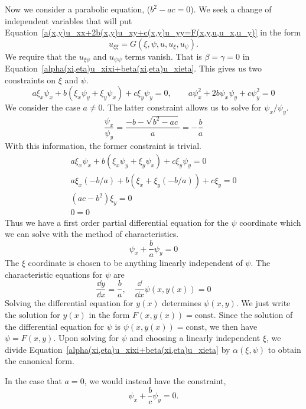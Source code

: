 Now we consider a parabolic equation, ($b^2 - a c = 0$).
We seek a change of independent variables that will put 
Equation~\ref{a(x,y)u_xx+2b(x,y)u_xy+c(x,y)u_yy=F(x,y,u,u_x,u_y)}
in the form
\begin{equation}
  \label{eqn uxixi=Gxipsiuuu}
  u_{\xi \xi} = G(\xi, \psi, u, u_\xi, u_\psi).
\end{equation}
We require that the $u_{\xi \psi}$ and $u_{\psi\psi}$ terms vanish.
That is $\beta = \gamma = 0$ in 
Equation~\ref{alpha(xi,eta)u_xixi+beta(xi,eta)u_xieta}.
This gives us two constraints on $\xi$ and $\psi$.
\[
a \xi_x \psi_x + b(\xi_x \psi_y + \xi_y \psi_x ) + c \xi_y \psi_y = 0, \qquad a \psi_x^2 + 2 b \psi_x \psi_y + c \psi_y^2 = 0 
\]
We consider the case $a \neq 0$.  The latter constraint allows us to solve 
for $\psi_x / \psi_y$.
\[
\frac{\psi_x}{\psi_y} = \frac{-b - \sqrt{b^2 - a c}}{a} = - \frac{b}{a}
\]
With this information, the former constraint is trivial.
\begin{gather*}
  a \xi_x \psi_x + b(\xi_x \psi_y + \xi_y \psi_x ) + c \xi_y \psi_y = 0
  \\
  a \xi_x (-b/a) + b(\xi_x + \xi_y (-b/a) ) + c \xi_y = 0
  \\
  (a c - b^2) \xi_y = 0
  \\
  0 = 0
\end{gather*}
Thus we have a first order partial differential equation for the $\psi$ 
coordinate which we can solve with the method of characteristics.
\[
\psi_x + \frac{b}{a} \psi_y = 0
\]
The $\xi$ coordinate is chosen to be anything linearly independent of $\psi$.
The characteristic equations for $\psi$ are 
\[
\frac{\dd y}{\dd x} = \frac{b}{a}, \quad
\frac{\dd}{\dd x} \psi(x,y(x)) = 0
\]
Solving the differential equation for $y(x)$ determines 
$\psi(x,y)$.  We just write the solution for $y(x)$ in the form
$F(x,y(x)) = \mathrm{const}$.  Since the solution of the differential equation
for $\psi$ is $\psi(x,y(x)) = \mathrm{const}$, we then have $\psi = F(x,y)$.
Upon solving for $\psi$ and choosing a linearly independent $\xi$, we divide 
Equation~\ref{alpha(xi,eta)u_xixi+beta(xi,eta)u_xieta}
by $\alpha(\xi,\psi)$ to obtain the canonical form.

In the case that $a = 0$, we would instead have the constraint,
\[
\psi_x + \frac{b}{c} \psi_y = 0.
\]








